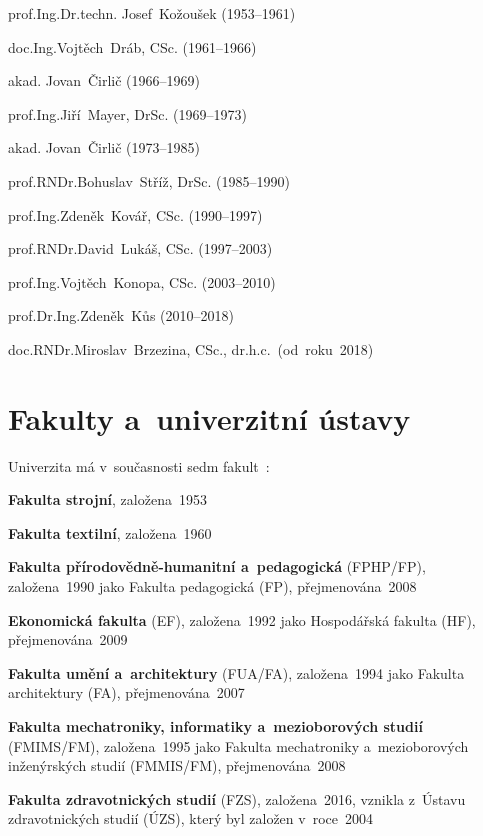 \documentclass[a4paper,12pt,fonts,nocapnumbers,listingsleft]{./tulpackage/tularticle}
\begin{document}
\begin{itemize*}
    \setlength{\itemsep}{-4pt}
    \item prof.\thinspace{}Ing.\thinspace{}Dr.\thinspace{}techn. Josef~Kožoušek (1953--1961)
    \item doc.\thinspace{}Ing.\thinspace{}Vojtěch~Dráb, CSc. (1961--1966)
    \item akad. Jovan~Čirlič (1966--1969)
    \item prof.\thinspace{}Ing.\thinspace{}Jiří~Mayer, DrSc. (1969--1973)
    \item akad. Jovan~Čirlič (1973--1985)
    \item prof.\thinspace{}RNDr.\thinspace{}Bohuslav~Stříž, DrSc. (1985--1990)
    \item prof.\thinspace{}Ing.\thinspace{}Zdeněk~Kovář, CSc. (1990--1997)
    \item prof.\thinspace{}RNDr.\thinspace{}David~Lukáš, CSc. (1997--2003)
    \item prof.\thinspace{}Ing.\thinspace{}Vojtěch~Konopa, CSc. (2003--2010)
    \item prof.\thinspace{}Dr.\thinspace{}Ing.\thinspace{}Zdeněk~Kůs (2010--2018)
    \item doc.\thinspace{}RNDr.\thinspace{}Miroslav~Brzezina, CSc., dr.\thinspace{}h.\thinspace{}c.\ (od~roku~2018)~\cite{golka}
\end{itemize*}

\clearpage

\section{Fakulty a~univerzitní ústavy}

Univerzita má v~současnosti sedm fakult~\cite{golka,jandova}:
\begin{itemize*}
    \setlength{\itemsep}{-4pt}
    \item \textbf{Fakulta strojní}, založena~1953
    \item \textbf{Fakulta textilní}, založena~1960
    \item \textbf{Fakulta přírodovědně-humanitní a~pedagogická} (FPHP/FP), založena~1990 jako Fakulta pedagogická (FP),
    přejmenována~2008
    \item \textbf{Ekonomická fakulta} (EF), založena~1992 jako Hospodářská fakulta (HF), přejmenována~2009
    \item \textbf{Fakulta umění a~architektury} (FUA/FA), založena~1994 jako Fakulta architektury (FA), přejmenována~2007
    \item \textbf{Fakulta mechatroniky, informatiky a~mezioborových studií} (FMIMS/FM), založena~1995 jako
    Fakulta mechatroniky a~mezioborových inženýrských studií (FMMIS/FM), přejmenována~2008
    \item \textbf{Fakulta zdravotnických studií} (FZS), založena~2016, vznikla z~Ústavu zdravotnických studií (ÚZS),
    který byl založen v~roce~2004
\end{itemize*}
\end{document}
